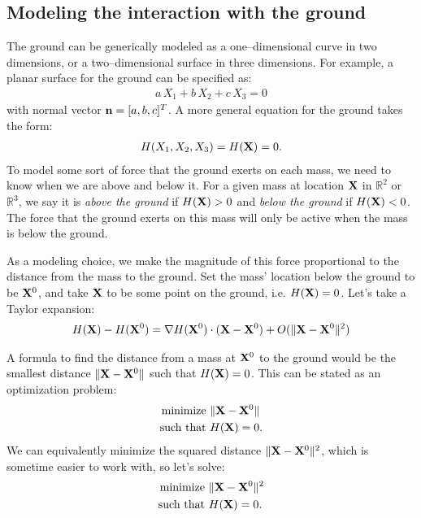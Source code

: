 \documentclass[10pt]{article}
\begin{document}
\subsection{Modeling the interaction with the ground}

The ground can be generically modeled as a one--dimensional curve in two dimensions, or a two--dimensional surface in three dimensions.  For example, a planar surface for the ground can be specified as:
\begin{align*}
a \, X_1 + b\, X_2 + c \,X_3 = 0
\end{align*}
with normal vector ${\bf n} = [a,b,c]^T$.  A more general equation for the ground takes the form:
\begin{align*}
H(X_1,X_2,X_3) = H({\bf X}) = 0.
\end{align*}
To model some sort of force that the ground exerts on each mass, we need to know when we are above and below it.  For a given mass at location ${\bf X}$ in $\mathbb{R}^2$ or $\mathbb{R}^3$, we say it is {\em above the ground} if $H({\bf X}) > 0$ and {\em below the ground} if $H({\bf X}) < 0$.  The force that the ground exerts on this mass will only be active when the mass is below the ground.

As a modeling choice, we make the magnitude of this force proportional to the distance from the mass to the ground.  Set the mass' location below the ground to be ${\bf X}^0$, and take ${\bf X}$ to be some point on the ground, i.e. $H({\bf X}) = 0$.  Let's take a Taylor expansion:
\begin{align}
\label{eq:te1}
H({\bf X}) - H({\bf X}^0) = \nabla H({\bf X}^0) \cdot ({\bf X} - {\bf X}^0) + O(\|{\bf X} - {\bf X}^0\|^2) 
\end{align}  

A formula to find the distance from a mass at ${\bf X}^0$ to the ground would be the smallest distance $\|{\bf X} - {\bf X}^0\|$ such that $H({\bf X}) = 0$.  This can be stated as an optimization problem:
\begin{align*}
\text{minimize } &\|{\bf X} - {\bf X}^0\| \\
\text{such that } &H({\bf X}) = 0.
\end{align*}
We can equivalently minimize the squared distance $\|{\bf X} - {\bf X}^0\|^2$, which is sometime easier to work with, so let's solve:
\begin{align*}
\text{minimize } &\|{\bf X} - {\bf X}^0\|^2 \\
\text{such that } &H({\bf X}) = 0.
\end{align*}
\end{document}
